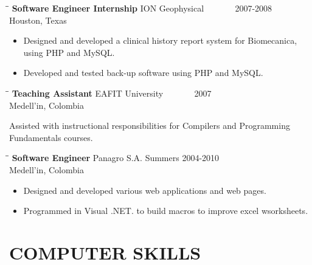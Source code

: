\documentclass{res}
\begin{document}
\begin{resume}
   \begin{tabbing}
   \hspace{2.3in}\= \hspace{2.6in}\= \kill %
    {\bf Software Engineer Internship} \> ION Geophysical\> ~~~~~~ 2007-2008\\
                             \>Houston, Texas
   \end{tabbing}\vspace{-5pt}      %
   \begin{itemize}
       \item Designed and developed a clinical history report system for Biomecanica, using PHP and MySQL.
       \item Developed and tested back-up software using PHP and MySQL.
   \end{itemize}

   \begin{tabbing}
   \hspace{2.3in}\= \hspace{2.6in}\= \kill %
    {\bf Teaching Assistant} \>EAFIT University\> ~~~~~~ 2007\\
                          \>Medell\a'in, Colombia
   \end{tabbing}\vspace{-5pt}
    Assisted with instructional responsibilities for Compilers and Programming Fundamentals courses.
   \begin{tabbing}%
   \hspace{2.3in}\= \hspace{2.6in}\= \kill %
   {\bf Software Engineer}\> Panagro S.A.\> Summers  2004-2010\\
                          \>Medell\a'in, Colombia
   \end{tabbing}\vspace{-5pt}
   \begin{itemize}
        \item Designed and developed various web applications and web pages.  
        \item Programmed in Visual .NET. to build macros to improve excel wsorksheets.
   \end{itemize}

\section{COMPUTER SKILLS}
	\vspace{0.05 in}	


\end{resume}
\end{document}
